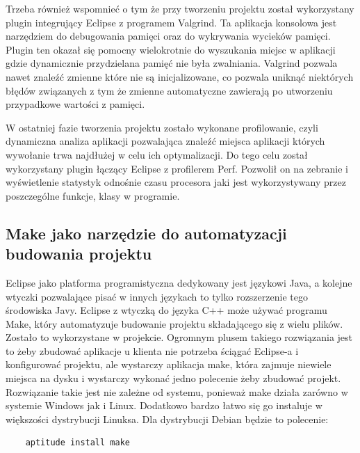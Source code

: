 Trzeba również wspomnieć o tym że przy tworzeniu projektu został wykorzystany plugin integrujący Eclipse z programem Valgrind. 
Ta aplikacja konsolowa jest narzędziem do debugowania pamięci oraz do wykrywania wycieków pamięci. Plugin ten okazał się pomocny wielokrotnie do wyszukania miejsc w aplikacji gdzie dynamicznie przydzielana pamięć nie była zwalniania. Valgrind pozwala nawet znaleźć zmienne które nie są inicjalizowane, co pozwala uniknąć niektórych błędów związanych z tym że zmienne automatyczne zawierają po utworzeniu przypadkowe wartości z pamięci. 

W ostatniej fazie tworzenia projektu zostało wykonane profilowanie, czyli dynamiczna analiza aplikacji pozwalająca znaleźć miejsca aplikacji których wywołanie trwa najdłużej w celu ich optymalizacji. Do tego celu został wykorzystany plugin łączący Eclipse z profilerem Perf. Pozwolił on na zebranie i wyświetlenie statystyk odnośnie czasu procesora jaki jest wykorzystywany przez poszczególne funkcje, klasy w programie.

\subsection{Make jako narzędzie do automatyzacji budowania projektu}
\hspace{1cm} Eclipse jako platforma programistyczna dedykowany jest językowi Java, a kolejne wtyczki pozwalające pisać w innych językach to tylko rozszerzenie tego środowiska Javy. Eclipse z wtyczką do języka C++ może używać programu Make, który automatyzuje budowanie projektu składającego się z wielu plików. Zostało to wykorzystane w projekcie. Ogromnym plusem takiego rozwiązania jest to żeby zbudować aplikacje u klienta nie potrzeba ściągać Eclipse-a i konfigurować projektu, ale wystarczy aplikacja make, która zajmuje niewiele miejsca na dysku i  wystarczy wykonać jedno polecenie żeby zbudować projekt. Rozwiązanie takie jest nie zależne od systemu, ponieważ make działa zarówno w systemie Windows jak i Linux. Dodatkowo bardzo łatwo się go instaluje w większości dystrybucji Linuksa. Dla dystrybucji Debian będzie to polecenie:

\begin{center}
\begin{verbatim}
	aptitude install make
\end{verbatim}
\end{center}

